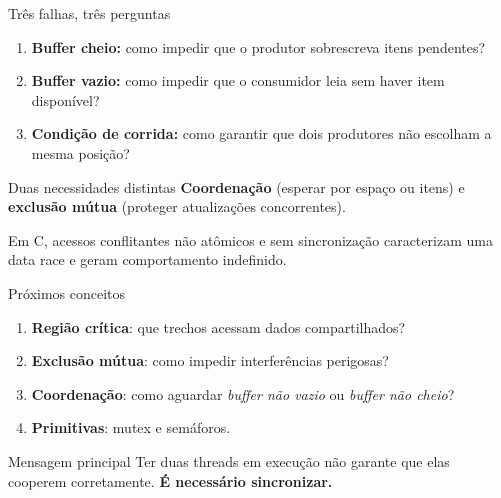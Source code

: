 \documentclass[aspectratio=169,11pt]{beamer}
\begin{document}
\begin{frame}{Três falhas, três perguntas}
\begin{enumerate}
\setlength\itemsep{1em}
\item \textbf{Buffer cheio:} como impedir que o produtor sobrescreva itens pendentes?
\item \textbf{Buffer vazio:} como impedir que o consumidor leia sem haver item disponível?
\item \textbf{Condição de corrida:} como garantir que dois produtores não escolham a mesma posição?
\end{enumerate}
\vfill
\begin{block}{Duas necessidades distintas}
\textbf{Coordenação} (esperar por espaço ou itens) e \textbf{exclusão mútua} (proteger atualizações concorrentes).
\end{block}
\footnotesize\textcolor{cinza}{Em C, acessos conflitantes não atômicos e sem sincronização caracterizam uma data race e geram comportamento indefinido.}
\end{frame}

\begin{frame}{Próximos conceitos}
\begin{enumerate}
\setlength\itemsep{0.8em}
\item \textbf{Região crítica}: que trechos acessam dados compartilhados?
\item \textbf{Exclusão mútua}: como impedir interferências perigosas?
\item \textbf{Coordenação}: como aguardar \emph{buffer não vazio} ou \emph{buffer não cheio}?
\item \textbf{Primitivas}: mutex e semáforos.
\end{enumerate}
\vfill
\begin{block}{Mensagem principal}
Ter duas threads em execução não garante que elas cooperem corretamente. \textbf{É necessário sincronizar.}
\end{block}
\end{frame}

\end{document}
